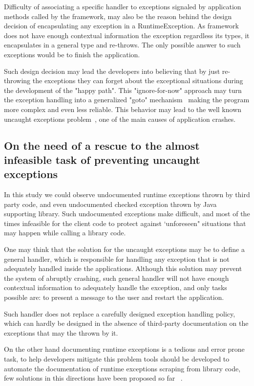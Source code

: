 \documentclass[conference]{IEEEtran}
\begin{document}
Difficulty of associating a specific handler to exceptions signaled by application methods called by the framework,
may also be the reason behind the design decision of encapsulating any exception in a RuntimeException.
As framework does not have enough contextual information the exception regardless its types,
it encapsulates in a general type and re-throws. The only possible answer to such exceptions would be 
to finish the application.

Such design decision may lead the developers into believing that by just re-throwing 
the exceptions they can forget about the exceptional situations during the development of the "happy path". 
This "ignore-for-now" approach may turn the exception handling into a generalized "goto" mechanism~\cite{mandrioli1992advances}
 making the program more complex and even less reliable. This behavior may lead to the well known uncaught exceptions 
problem~\cite{jo2004uncaught}, one of the main causes of application crashes.  

\subsection{On the need of a rescue to the almost infeasible task of preventing uncaught exceptions}
In this study we could observe undocumented runtime exceptions thrown by third party code,
and even undocumented checked exception thrown by Java supporting library.
Such undocumented exceptions make difficult, and most of the times infeasible
for the client code to protect against `unforeseen" situations that may happen 
while calling a library code.

One may think that the solution for the uncaught exceptions 
may be to define a general handler, 
which is responsible for handling any exception that is not
adequately handled inside the applications. Although this 
solution may prevent  the system of abruptly crashing,
 such general handler will not have enough
contextual information to adequately handle the exception, 
and only tasks possible are: to present a message to the user
 and restart the application.

Such handler does not replace a carefully designed exception 
handling policy, which can hardly be designed in the absence of 
third-party documentation on the exceptions that
may the thrown by it.

On the other hand documenting runtime exceptions is a tedious and error prone task, to help developers
mitigate this problem tools should be developed to automate the documentation of runtime exceptions
scraping from library code, few solutions in this directions have been proposed so far ~\cite{van2005combining}. 
\end{document}
